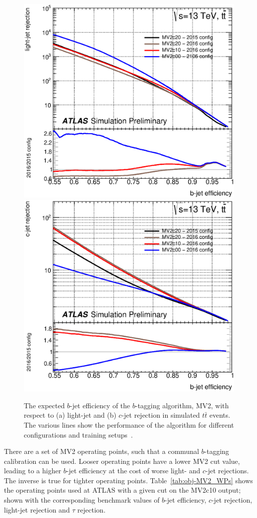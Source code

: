     
\begin{figure}[!ht]
  \begin{center}
    \captionsetup[subfigure]{aboveskip=0pt,justification=centering}
     {\includegraphics[width=0.48\linewidth, angle=0]{figs/Objects/bjets_perf_light.eps}}
      { \includegraphics[width=0.48\linewidth, angle=0]{figs/Objects/bjets_perf_charm.eps}}
  \end{center}
  \vspace{-1em}
  \caption[The expected $b$-jet efficiency of the $b$-tagging algorithm, MV2, with respect to
    light-jet and $c$-jet rejection in simulated $t\bar{t}$ events.]
    {The expected $b$-jet efficiency of the $b$-tagging algorithm, MV2, with respect to
    (a) light-jet and (b) $c$-jet rejection in simulated $t\bar{t}$ events.
    The various lines show the performance of the algorithm for different configurations and training setups~\cite{obj-bjets_algo_2016}.}
  \label{fig:obj-bjets_perf}
\end{figure}

There are a set of MV2 operating points, such that a communal $b$-tagging calibration can be used.
Looser operating points have a lower MV2 cut value, leading to a higher $b$-jet efficiency at the cost of worse light- and $c$-jet rejections.
The inverse is true for tighter operating points.
Table~\ref{tab:obj-MV2_WPs} shows the operating points used at ATLAS with a given cut on the MV2c10 output;
shown with the corresponding benchmark values of $b$-jet efficiency, $c$-jet rejection, light-jet rejection and $\tau$ rejection.

